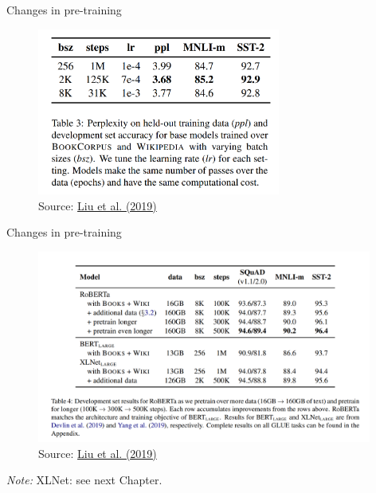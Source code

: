 
\begin{frame}{Changes in pre-training}

\vfill

\begin{figure}
\centering
\includegraphics[width = 8cm]{figure/roberta-undertrained.png}\\ 
\footnotesize{Source:} \href{https://arxiv.org/pdf/1907.11692.pdf}{\footnotesize Liu et al. (2019)}
\end{figure}

\vfill

\end{frame}


\begin{frame}{Changes in pre-training}

\vfill

\begin{figure}
\centering
\includegraphics[width = 11cm]{figure/roberta-undertrained2.png}\\ 
\footnotesize{Source:} \href{https://arxiv.org/pdf/1907.11692.pdf}{\footnotesize Liu et al. (2019)}
\end{figure}
\footnotesize
\textit{Note:} XLNet: see next Chapter.

\vfill

\end{frame}

